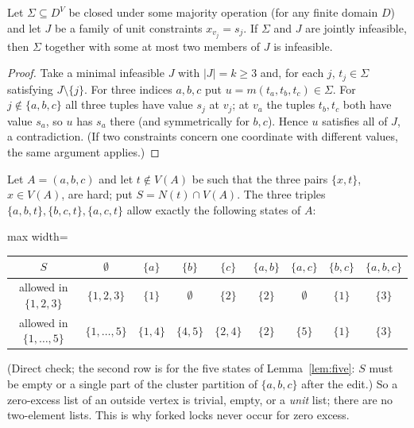 \begin{lemma}\label{lem:sfH2}
Let $\Sigma\subseteq D^V$ be closed under some majority operation (for any finite domain $D$) and let $J$ be a family of unit constraints $x_{v_j}=s_j$. If $\Sigma$ and $J$ are jointly infeasible, then $\Sigma$ together with some at most two members of $J$ is infeasible.
\end{lemma}
\begin{proof}
Take a minimal infeasible $J$ with $|J|=k\ge3$ and, for each $j$, $t_j\in\Sigma$ satisfying $J\setminus\{j\}$. For three indices $a,b,c$ put $u=m(t_a,t_b,t_c)\in\Sigma$. For $j\notin\{a,b,c\}$ all three tuples have value $s_j$ at $v_j$; at $v_a$ the tuples $t_b,t_c$ both have value $s_a$, so $u$ has $s_a$ there (and symmetrically for $b,c$). Hence $u$ satisfies all of $J$, a contradiction. (If two constraints concern one coordinate with different values, the same argument applies.)
\end{proof}

\begin{observation}\label{obs:lists}
Let $A=(a,b,c)$ and let $t\notin V(A)$ be such that the three pairs $\{x,t\}$, $x\in V(A)$, are hard; put $S=N(t)\cap V(A)$. The three triples $\{a,b,t\},\{b,c,t\},\{a,c,t\}$ allow exactly the following states of $A$:
\begin{center}
\begin{adjustbox}{max width=\linewidth}\begin{tabular}{c|cccccccc}
$S$ & $\emptyset$ & $\{a\}$ & $\{b\}$ & $\{c\}$ & $\{a,b\}$ & $\{a,c\}$ & $\{b,c\}$ & $\{a,b,c\}$\\\hline
allowed in $\{1,2,3\}$ & $\{1,2,3\}$ & $\{1\}$ & $\emptyset$ & $\{2\}$ & $\{2\}$ & $\emptyset$ & $\{1\}$ & $\{3\}$\\
allowed in $\{1,\dots,5\}$ & $\{1,\dots,5\}$ & $\{1,4\}$ & $\{4,5\}$ & $\{2,4\}$ & $\{2\}$ & $\{5\}$ & $\{1\}$ & $\{3\}$
\end{tabular}\end{adjustbox}
\end{center}
(Direct check; the second row is for the five states of Lemma~\ref{lem:five}: $S$ must be empty or a single part of the cluster partition of $\{a,b,c\}$ after the edit.) So a zero-excess list of an outside vertex is trivial, empty, or a \emph{unit} list; there are no two-element lists. This is why forked locks never occur for zero excess.
\end{observation}


